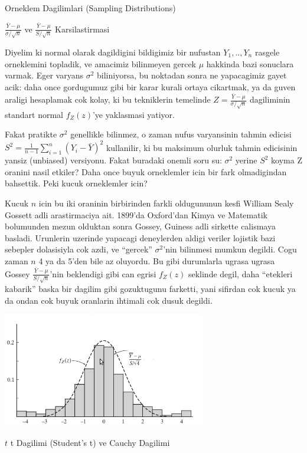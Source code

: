 \documentclass[12pt,fleqn]{article}\usepackage{../common}
\begin{document}
Orneklem Dagilimlari (Sampling Distributions)

$\frac{\bar{Y}-\mu}{\sigma / \sqrt{n}}$ ve $\frac{\bar{Y}-\mu}{S /
  \sqrt{n}}$ Karsilastirmasi

Diyelim ki normal olarak dagildigini bildigimiz bir nufustan $Y_1,..,Y_n$
rasgele orneklemini topladik, ve amacimiz bilinmeyen gercek $\mu$ hakkinda
bazi sonuclara varmak. Eger varyans $\sigma^2$ biliniyorsa, bu noktadan
sonra ne yapacagimiz gayet acik: daha once gordugumuz gibi bir karar kurali
ortaya cikartmak, ya da guven araligi hesaplamak cok kolay, ki bu
tekniklerin temelinde $Z = \frac{\bar{Y}-\mu}{\sigma / \sqrt{n}}$ dagiliminin standart normal $f_Z(z)$'ye 
yaklasmasi yatiyor. 

Fakat pratikte $\sigma^2$ genellikle bilinmez, o zaman nufus varyansinin
tahmin edicisi $S^2 = \frac{1}{n-1}\sum_{i=1}^n (Y_i-\bar{Y})^2$
kullanilir, ki bu maksimum olurluk tahmin edicisinin yansiz (unbiased)
versiyonu. Fakat buradaki onemli soru su: $\sigma^2$ yerine $S^2$ koyma Z
oranini nasil etkiler? Daha once buyuk orneklemler icin bir fark
olmadigindan bahsettik. Peki kucuk orneklemler icin? 

Kucuk $n$ icin bu iki oraninin birbirinden farkli oldugununun kesfi William
Sealy Gossett adli arastirmaciya ait. 1899'da Oxford'dan Kimya ve Matematik
bolumunden mezun olduktan sonra Gossey, Guiness adli sirkette calismaya
basladi. Urunlerin uzerinde yapacagi deneylerden aldigi veriler lojistik
bazi sebepler dolasisiyla cok azdi, ve ``gercek'' $\sigma^2$'nin bilinmesi
mumkun degildi. Cogu zaman $n$ 4 ya da 5'den bile az oluyordu. Bu gibi
durumlarla ugrasa ugrasa Gossey $\frac{\bar{Y}-\mu}{S / \sqrt{n}}$'nin
beklendigi gibi can egrisi $f_Z(z)$ seklinde degil, daha ``etekleri
kabarik'' baska bir dagilim gibi gozuktugunu farketti, yani sifirdan cok
kucuk ya da ondan cok buyuk oranlarin ihtimali cok dusuk degildi. 
 

\includegraphics[height=5cm]{t1.png}


$t$ t Dagilimi (Student's t) ve Cauchy Dagilimi 
\end{document}
